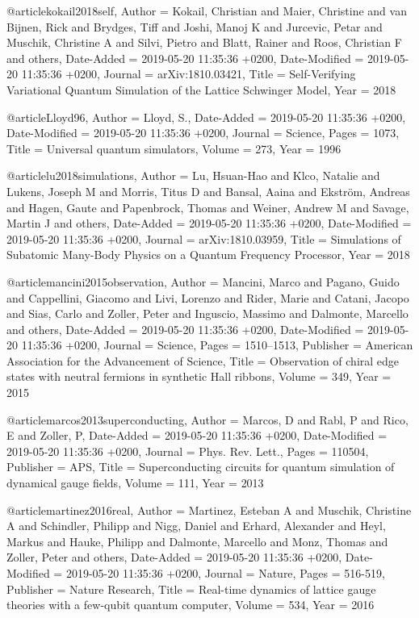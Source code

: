 \documentclass[epj,final]{svjour}
\begin{document}
@article{kokail2018self,
	Author = {Kokail, Christian and Maier, Christine and van Bijnen, Rick and Brydges, Tiff and Joshi, Manoj K and Jurcevic, Petar and Muschik, Christine A and Silvi, Pietro and Blatt, Rainer and Roos, Christian F and others},
	Date-Added = {2019-05-20 11:35:36 +0200},
	Date-Modified = {2019-05-20 11:35:36 +0200},
	Journal = {arXiv:1810.03421},
	Title = {Self-Verifying Variational Quantum Simulation of the Lattice {Schwinger} Model},
	Year = {2018}}

@article{Lloyd96,
	Author = {Lloyd, S.},
	Date-Added = {2019-05-20 11:35:36 +0200},
	Date-Modified = {2019-05-20 11:35:36 +0200},
	Journal = {Science},
	Pages = {1073},
	Title = {{Universal quantum simulators}},
	Volume = {273},
	Year = {1996}}

@article{lu2018simulations,
	Author = {Lu, Hsuan-Hao and Klco, Natalie and Lukens, Joseph M and Morris, Titus D and Bansal, Aaina and Ekstr{\"o}m, Andreas and Hagen, Gaute and Papenbrock, Thomas and Weiner, Andrew M and Savage, Martin J and others},
	Date-Added = {2019-05-20 11:35:36 +0200},
	Date-Modified = {2019-05-20 11:35:36 +0200},
	Journal = {arXiv:1810.03959},
	Title = {Simulations of Subatomic Many-Body Physics on a Quantum Frequency Processor},
	Year = {2018}}

@article{mancini2015observation,
	Author = {Mancini, Marco and Pagano, Guido and Cappellini, Giacomo and Livi, Lorenzo and Rider, Marie and Catani, Jacopo and Sias, Carlo and Zoller, Peter and Inguscio, Massimo and Dalmonte, Marcello and others},
	Date-Added = {2019-05-20 11:35:36 +0200},
	Date-Modified = {2019-05-20 11:35:36 +0200},
	Journal = {Science},
	Pages = {1510--1513},
	Publisher = {American Association for the Advancement of Science},
	Title = {Observation of chiral edge states with neutral fermions in synthetic {Hall} ribbons},
	Volume = {349},
	Year = {2015}}

@article{marcos2013superconducting,
	Author = {Marcos, D and Rabl, P and Rico, E and Zoller, P},
	Date-Added = {2019-05-20 11:35:36 +0200},
	Date-Modified = {2019-05-20 11:35:36 +0200},
	Journal = {Phys. Rev. Lett.},
	Pages = {110504},
	Publisher = {APS},
	Title = {Superconducting circuits for quantum simulation of dynamical gauge fields},
	Volume = {111},
	Year = {2013}}

@article{martinez2016real,
	Author = {Martinez, Esteban A and Muschik, Christine A and Schindler, Philipp and Nigg, Daniel and Erhard, Alexander and Heyl, Markus and Hauke, Philipp and Dalmonte, Marcello and Monz, Thomas and Zoller, Peter and others},
	Date-Added = {2019-05-20 11:35:36 +0200},
	Date-Modified = {2019-05-20 11:35:36 +0200},
	Journal = {Nature},
	Pages = {516-519},
	Publisher = {Nature Research},
	Title = {Real-time dynamics of lattice gauge theories with a few-qubit quantum computer},
	Volume = {534},
	Year = {2016}}
\end{document}
